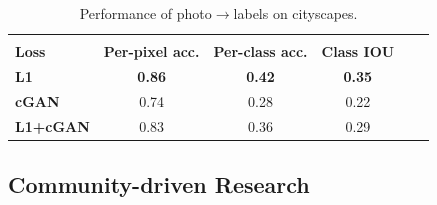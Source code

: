 \documentclass[10pt,twocolumn,letterpaper]{article}
\begin{document}
\begin{table}
\centering
\scalebox{0.75} {
\begin{tabular}{lccccc}
 & & & \\
\textbf{Loss} & \textbf{Per-pixel acc.} & \textbf{Per-class acc.} & \textbf{Class IOU} \\ \hline
\textbf{L1} & \textbf{0.86} & \textbf{0.42} & \textbf{0.35} \\
\textbf{cGAN} & 0.74 & 0.28 & 0.22 \\
\textbf{L1+cGAN} & 0.83 & 0.36 & 0.29 \\ %
\end{tabular} }
\vspace{-0.1in}
\caption {Performance of photo$\rightarrow$labels on cityscapes.}
\vspace{-0.2in}
\label{tab:image_to_labels_results}
\end{table}



\subsection{Community-driven Research}
\end{document}
